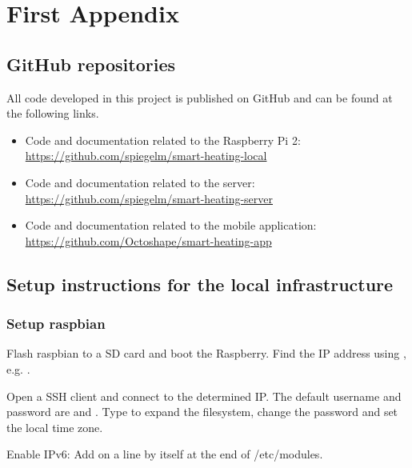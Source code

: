 
\chapter{First Appendix}
\label{sec:first_appendix}

\section{GitHub repositories}

All code developed in this project is published on GitHub and can be found at the following links.

\begin{itemize}
	\item{Code and documentation related to the Raspberry Pi 2:\\ \url{https://github.com/spiegelm/smart-heating-local}}
	
	\item{Code and documentation related to the server:\\ \url{https://github.com/spiegelm/smart-heating-server}}
	
	\item{Code and documentation related to the mobile application:\\ \url{https://github.com/Octoshape/smart-heating-app}}
\end{itemize}

\section{Setup instructions for the local infrastructure}


\subsection{Setup raspbian}\label{setup-raspbian}

Flash raspbian to a SD card and boot the Raspberry. Find the IP address
using , e.g.
.

Open a SSH client and connect to the determined IP. The default username
and password are  and . Type
 to expand the filesystem, change the
password and set the local time zone.

Enable IPv6: Add  on a line by itself at the end of
/etc/modules.

